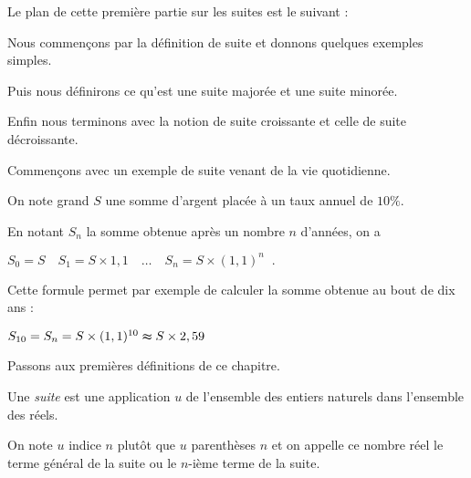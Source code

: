 







\debuttexte

\diapo

\change

Le plan de cette première partie sur les suites est le suivant :

\change

Nous commençons par la définition de suite et donnons quelques exemples simples.

\change

Puis nous définirons ce qu'est une suite majorée et une suite minorée.

\change

Enfin nous terminons avec la notion de suite croissante et celle de suite décroissante.


\diapo

Commençons avec un exemple de suite venant de la vie quotidienne.

On note grand $S$ une somme d'argent placée à un taux annuel de $10\%$.

\change

En notant $S_n$ la somme obtenue après un nombre $n$ d'années, on a

\change

$S_0=S \quad    S_1=S\times 1,1\quad \ldots \quad   S_n=S\times (1,1)^n \;\;.$

\change 

Cette formule permet par exemple de calculer la somme obtenue au bout de dix ans :

$S_{10}=S_n=S\times (1,1)^{10}\thickapprox S\times 2,59$


\diapo

Passons aux premières définitions de ce chapitre.

\change

Une \emph{suite} est une application $u$ de l'ensemble des entiers naturels dans l'ensemble des réels.

\change

On note $u$ indice $n$ plutôt que $u$ parenthèses $n$ et on appelle ce nombre réel le terme général de la suite ou 
le $n$-ième terme de la suite.

